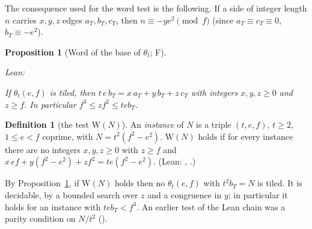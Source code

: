 \documentclass[11pt,reqno]{amsart}
\theoremstyle{plain}
\newtheorem{proposition}[theorem]{Proposition}
\theoremstyle{definition}
\newtheorem{definition}[theorem]{Definition}
\newcommand{\sF}{\textup{\textsf{F}}}
\begin{document}
The consequence used for the word test is the following. If a side of integer length $n$ carries $x,y,z$ edges $a_T,b_T,c_T$, then $n\equiv-ye^2\pmod f$ (since $a_T\equiv c_T\equiv0$, $b_T\equiv-e^2$).
\begin{proposition}[Word of the base of $\theta_t$; \sF]\label{prop:theta}
{\small\noindent\emph{Lean:} \par}
If $\theta_t(e,f)$ is tiled, then $t\,e\,b_T=x\,a_T+y\,b_T+z\,c_T$ with integers $x,y,z\ge0$ and $z\ge f$. In particular $f^3\le zf^2\le teb_T$.
\end{proposition}
\begin{definition}[the test $\mathrm W(N)$]\label{def:Wtest}
An \emph{instance} of $N$ is a triple $(t,e,f)$, $t\ge2$, $1\le e<f$ coprime, with $N=t^2(f^2-e^2)$. $\mathrm W(N)$ holds if for every instance there are no integers $x,y,z\ge0$ with $z\ge f$ and $x\,ef+y(f^2-e^2)+zf^2=te(f^2-e^2)$. (Lean: , .)
\end{definition}
By Proposition~\ref{prop:theta}, if $\mathrm W(N)$ holds then no $\theta_t(e,f)$ with $t^2b_T=N$ is tiled. It is decidable, by a bounded search over $z$ and a congruence in $y$; in particular it holds for an instance with $teb_T<f^3$. An earlier test of the Lean chain was a parity condition on $N/t^2$ ().
\end{document}
